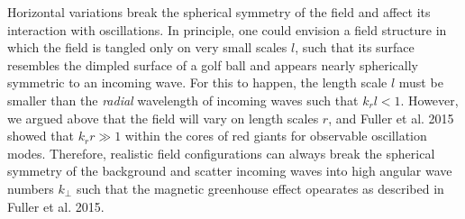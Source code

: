 Horizontal variations break the spherical symmetry of the field and affect its interaction with oscillations. In principle, one could envision a field structure in which the field is tangled only on very small scales $l$, such that its surface resembles the dimpled surface of a golf ball and appears nearly spherically symmetric to an incoming wave. For this to happen, the length scale $l$ must be smaller than the {\it radial} wavelength of incoming waves such that $k_r l < 1.$ However, we argued above that the field will vary on length scales $r$, and Fuller et al. 2015 showed that $k_r r \gg 1$ within the cores of red giants for observable oscillation modes. Therefore, realistic field configurations can always break the spherical symmetry of the background and scatter incoming waves into high angular wave numbers $k_\perp$ such that the magnetic greenhouse effect opearates as described in Fuller et al. 2015.